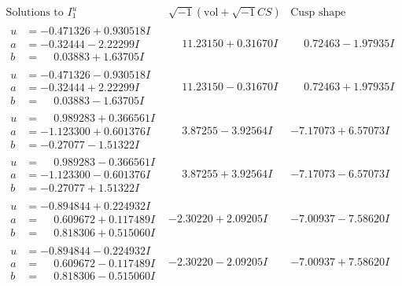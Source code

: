\documentclass[1p]{elsarticle_modified}
\theoremstyle{definition}
\newcommand{\I}{\sqrt{-1}}
\begin{document}
$$\begin{array}{c|c|c}  
\text{Solutions to }I^u_{1}& \I (\text{vol} + \sqrt{-1}CS) & \text{Cusp shape}\\
 \hline 
\begin{aligned}
u &= -0.471326 + 0.930518 I \\
a &= -0.32444 - 2.22299 I \\
b &= \phantom{-}0.03883 + 1.63705 I\end{aligned}
 & \phantom{-}11.23150 + 0.31670 I & \phantom{-}0.72463 - 1.97935 I \\ \hline\begin{aligned}
u &= -0.471326 - 0.930518 I \\
a &= -0.32444 + 2.22299 I \\
b &= \phantom{-}0.03883 - 1.63705 I\end{aligned}
 & \phantom{-}11.23150 - 0.31670 I & \phantom{-}0.72463 + 1.97935 I \\ \hline\begin{aligned}
u &= \phantom{-}0.989283 + 0.366561 I \\
a &= -1.123300 + 0.601376 I \\
b &= -0.27077 - 1.51322 I\end{aligned}
 & \phantom{-}3.87255 - 3.92564 I & -7.17073 + 6.57073 I \\ \hline\begin{aligned}
u &= \phantom{-}0.989283 - 0.366561 I \\
a &= -1.123300 - 0.601376 I \\
b &= -0.27077 + 1.51322 I\end{aligned}
 & \phantom{-}3.87255 + 3.92564 I & -7.17073 - 6.57073 I \\ \hline\begin{aligned}
u &= -0.894844 + 0.224932 I \\
a &= \phantom{-}0.609672 + 0.117489 I \\
b &= \phantom{-}0.818306 + 0.515060 I\end{aligned}
 & -2.30220 + 2.09205 I & -7.00937 - 7.58620 I \\ \hline\begin{aligned}
u &= -0.894844 - 0.224932 I \\
a &= \phantom{-}0.609672 - 0.117489 I \\
b &= \phantom{-}0.818306 - 0.515060 I\end{aligned}
 & -2.30220 - 2.09205 I & -7.00937 + 7.58620 I \\ \hline\begin{aligned}

\end{aligned}
\end{array}$$
\end{document}
